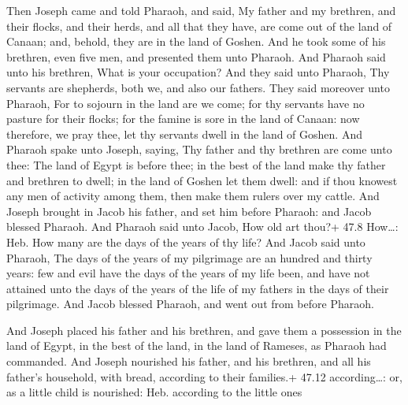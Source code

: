  Then Joseph came and told Pharaoh, and said, My father and
my brethren, and their flocks, and their herds, and all that they have,
are come out of the land of Canaan; and, behold, they are in the land of
Goshen.  And he took some of his brethren, even five men,
and presented them unto Pharaoh.  And Pharaoh said unto his
brethren, What is your occupation? And they said unto Pharaoh, Thy
servants are shepherds, both we, and also our fathers.  They
said moreover unto Pharaoh, For to sojourn in the land are we come; for
thy servants have no pasture for their flocks; for the famine is sore in
the land of Canaan: now therefore, we pray thee, let thy servants dwell
in the land of Goshen.  And Pharaoh spake unto Joseph,
saying, Thy father and thy brethren are come unto thee:  The
land of Egypt is before thee; in the best of the land make thy father
and brethren to dwell; in the land of Goshen let them dwell: and if thou
knowest any men of activity among them, then make them rulers over my
cattle.  And Joseph brought in Jacob his father, and set him
before Pharaoh: and Jacob blessed Pharaoh.  And Pharaoh said
unto Jacob, How old art thou?+ 47.8 How\ldots: Heb. How many are the
days of the years of thy life?  And Jacob said unto Pharaoh,
The days of the years of my pilgrimage are an hundred and thirty years:
few and evil have the days of the years of my life been, and have not
attained unto the days of the years of the life of my fathers in the
days of their pilgrimage.  And Jacob blessed Pharaoh, and
went out from before Pharaoh.

 And Joseph placed his father and his brethren, and gave
them a possession in the land of Egypt, in the best of the land, in the
land of Rameses, as Pharaoh had commanded.  And Joseph
nourished his father, and his brethren, and all his father's household,
with bread, according to their families.+ 47.12 according\ldots: or, as
a little child is nourished: Heb. according to the little ones

